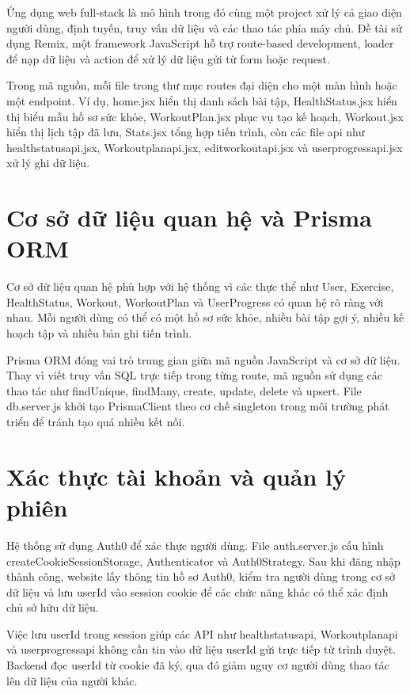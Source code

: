 Ứng dụng web full-stack là mô hình trong đó cùng một project xử lý cả giao diện người dùng, định tuyến, truy vấn dữ liệu và các thao tác phía máy chủ. Đề tài sử dụng Remix, một framework JavaScript hỗ trợ route-based development, loader để nạp dữ liệu và action để xử lý dữ liệu gửi từ form hoặc request.


Trong mã nguồn, mỗi file trong thư mục routes đại diện cho một màn hình hoặc một endpoint. Ví dụ, home.jsx hiển thị danh sách bài tập, HealthStatus.jsx hiển thị biểu mẫu hồ sơ sức khỏe, WorkoutPlan.jsx phục vụ tạo kế hoạch, Workout.jsx hiển thị lịch tập đã lưu, Stats.jsx tổng hợp tiến trình, còn các file api như healthstatusapi.jsx, Workoutplanapi.jsx, editworkoutapi.jsx và userprogressapi.jsx xử lý ghi dữ liệu.


\section{Cơ sở dữ liệu quan hệ và Prisma ORM}

Cơ sở dữ liệu quan hệ phù hợp với hệ thống vì các thực thể như User, Exercise, HealthStatus, Workout, WorkoutPlan và UserProgress có quan hệ rõ ràng với nhau. Mỗi người dùng có thể có một hồ sơ sức khỏe, nhiều bài tập gợi ý, nhiều kế hoạch tập và nhiều bản ghi tiến trình.


Prisma ORM đóng vai trò trung gian giữa mã nguồn JavaScript và cơ sở dữ liệu. Thay vì viết truy vấn SQL trực tiếp trong từng route, mã nguồn sử dụng các thao tác như findUnique, findMany, create, update, delete và upsert. File db.server.js khởi tạo PrismaClient theo cơ chế singleton trong môi trường phát triển để tránh tạo quá nhiều kết nối.


\section{Xác thực tài khoản và quản lý phiên}

Hệ thống sử dụng Auth0 để xác thực người dùng. File auth.server.js cấu hình createCookieSessionStorage, Authenticator và Auth0Strategy. Sau khi đăng nhập thành công, website lấy thông tin hồ sơ Auth0, kiểm tra người dùng trong cơ sở dữ liệu và lưu userId vào session cookie để các chức năng khác có thể xác định chủ sở hữu dữ liệu.


Việc lưu userId trong session giúp các API như healthstatusapi, Workoutplanapi và userprogressapi không cần tin vào dữ liệu userId gửi trực tiếp từ trình duyệt. Backend đọc userId từ cookie đã ký, qua đó giảm nguy cơ người dùng thao tác lên dữ liệu của người khác.


